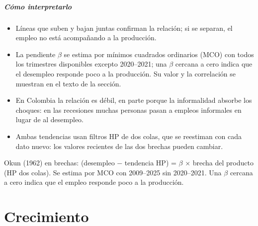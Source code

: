 \paragraph{Cómo interpretarlo}
\begin{itemize}
\item Líneas que suben y bajan juntas confirman la relación; si se separan, el empleo no está acompañando a la producción.
\item La pendiente $\beta$ se estima por mínimos cuadrados ordinarios (MCO) con todos los trimestres disponibles excepto 2020–2021; una $\beta$ cercana a cero indica que el desempleo responde poco a la producción. Su valor y la correlación se muestran en el texto de la sección.
\item En Colombia la relación es débil, en parte porque la informalidad absorbe los choques: en las recesiones muchas personas pasan a empleos informales en lugar de al desempleo.
\item Ambas tendencias usan filtros HP de dos colas, que se reestiman con cada dato nuevo: los valores recientes de las dos brechas pueden cambiar.
\end{itemize}
\begin{formulas}[Fórmulas]
\end{formulas}
\begin{metodo}[Metodología]
Okun (1962) en brechas: (desempleo − tendencia HP) = $\beta$ $\times$ brecha del producto (HP dos colas). Se estima por MCO con 2009–2025 sin 2020–2021. Una $\beta$ cercana a cero indica que el empleo responde poco a la producción.
\par{}
\end{metodo}

\chapter{Crecimiento}
\label{atlas:crecimiento}

